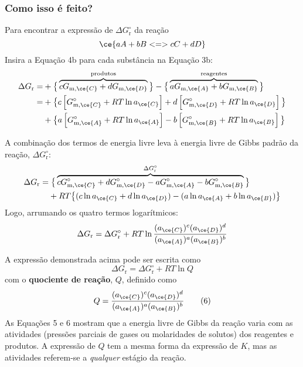 \begin{derivation}

\subsubsection{Como isso é feito?}

Para encontrar a expressão de \(\Delta G_\mathrm{r}^\circ\) da reação \[
    \ce{a A + b B <=> c C + d D } 
\] Insira a Equação 4b para cada substância na Equação 3b: \[
\begin{aligned}
    \Delta G_\mathrm{r} =&  
        + \big\{
            \overbrace{ c G_{\mathrm{m}, \ce{C}} + d G_{\mathrm{m}, \ce{D}} }^{\text{produtos}} 
        \big\}
        - 
        \big\{
            \overbrace{ a G_{\mathrm{m}, \ce{A}} + b G_{\mathrm{m}, \ce{B}} }^{\text{reagentes}} 
        \big\} 
        \\
        =& 
        + \big\{
            c \left[ G_{\mathrm{m}, \ce{C}}^\circ + RT \ln a_{\ce{C}} \right]
            + d \left[ G_{\mathrm{m}, \ce{D}}^\circ + RT \ln a_{\ce{D}} \right] 
        \big\}
        \\
        & 
        + \big\{
            a \left[ G_{\mathrm{m}, \ce{A}}^\circ + RT \ln a_{\ce{A}} \right]
            - b \left[ G_{\mathrm{m}, \ce{B}}^\circ + RT \ln a_{\ce{B}} \right]
        \big\}
\end{aligned}
\]

A combinação dos termos de energia livre leva à energia livre de Gibbs padrão da reação, \(\Delta G_\mathrm{r}^\circ\): \[
\begin{aligned}
        \Delta G_\mathrm{r} =&  
        \; \big\{
            \overbrace{ 
                c G_{\mathrm{m}, \ce{C}}^\circ 
                + d G_{\mathrm{m}, \ce{D}}^\circ
                - a G_{\mathrm{m}, \ce{A}}^\circ 
                - b G_{\mathrm{m}, \ce{B}}^\circ 
            }^{ \Delta G_\mathrm{r}^\circ }
        \big\}
        \\
        &
        + RT \big\{ 
            ( c \ln a_{\ce{C}} + d \ln a_{\ce{D}} ) 
            - ( a \ln a_{\ce{A}} + b \ln a_{\ce{B}} )
        \big\}
\end{aligned}
\] Logo, arrumando os quatro termos logarítmicos: \[
    \Delta G_\mathrm{r} = 
        \Delta G_\mathrm{r}^\circ 
        + RT \ln \dfrac{ (a_{\ce{C}})^c (a_{\ce{D}})^d }{ (a_{\ce{A}})^a (a_{\ce{B}})^b }  
\]

\end{derivation}

A expressão demonstrada acima pode ser escrita como \[
    \Delta G_\mathrm{r} = \Delta G_\mathrm{r}^\circ + RT \ln Q
\tag{5}
\] com o \textbf{quociente de reação}, \(Q\), definido como \[
    Q = \dfrac{ (a_{\ce{C}})^c (a_{\ce{D}})^d }{ (a_{\ce{A}})^a (a_{\ce{B}})^b }
\tag{6}
\] As Equações 5 e 6 mostram que a energia livre de Gibbs da reação varia com as atividades (pressões parciais de gases ou molaridades de solutos) dos
reagentes e produtos. A expressão de \(Q\) tem a mesma forma da expressão de \(K\), mas as atividades referem-se a \emph{qualquer} estágio da reação.

